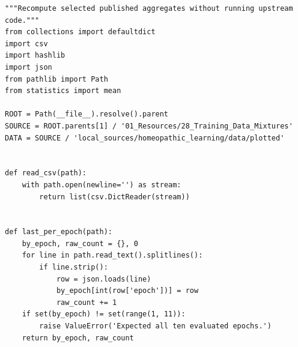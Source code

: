 \begin{Verbatim}[breaklines,breakanywhere,fontsize=\small]
"""Recompute selected published aggregates without running upstream code."""
from collections import defaultdict
import csv
import hashlib
import json
from pathlib import Path
from statistics import mean

ROOT = Path(__file__).resolve().parent
SOURCE = ROOT.parents[1] / '01_Resources/28_Training_Data_Mixtures'
DATA = SOURCE / 'local_sources/homeopathic_learning/data/plotted'


def read_csv(path):
    with path.open(newline='') as stream:
        return list(csv.DictReader(stream))


def last_per_epoch(path):
    by_epoch, raw_count = {}, 0
    for line in path.read_text().splitlines():
        if line.strip():
            row = json.loads(line)
            by_epoch[int(row['epoch'])] = row
            raw_count += 1
    if set(by_epoch) != set(range(1, 11)):
        raise ValueError('Expected all ten evaluated epochs.')
    return by_epoch, raw_count



\end{Verbatim}
